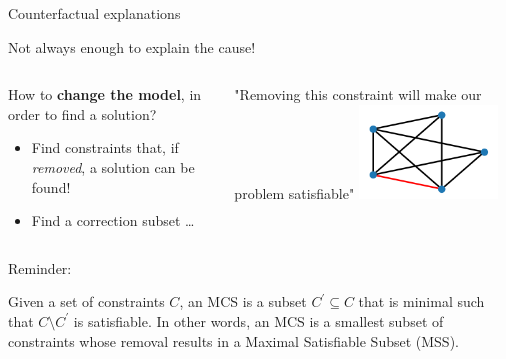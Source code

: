 \documentclass{cons-beamer}
\begin{document}
\begin{frame}{Counterfactual explanations}

  Not always enough to explain the cause!
  \vspace{-0.5cm}
  \begin{columns}
    \begin{column}{0.75\textwidth}
      How to \textbf{change the model}, in order to find a solution?
      \vfill

      \begin{itemize}
        \item Find constraints that, if \textit{removed}, a solution can be found!
        \item Find a correction subset \dots
      \end{itemize}
    \end{column}
    \begin{column}{0.3\textwidth}
      \begin{center}
        "Removing this constraint will make our problem satisfiable"
        \includegraphics[height=25mm]{images/texpl_img/graph_mcs_red.png}
      \end{center}
    \end{column}
  \end{columns}


  Reminder: 
  \begin{definition}
    Given a set of constraints $C$, an MCS is a subset $C^{\prime} \subseteq C$ that is minimal such that $C \setminus C^{\prime}$ is satisfiable. In other words, an MCS is a smallest subset of constraints whose removal results in a Maximal Satisfiable Subset (MSS).
  \end{definition}
\end{frame}
\end{document}
